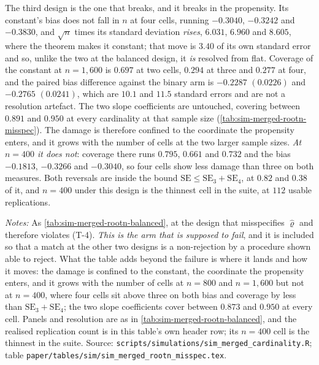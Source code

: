 \documentclass[
  12pt]{article}
\newcommand{\1}[1]{\mathds{1}\left[#1\right]}
\theoremstyle{plain}
\theoremstyle{definition}
\theoremstyle{definition}
\theoremstyle{remark}
\begin{document}
The third design is the one that breaks, and it breaks in the
propensity. Its constant's bias does not fall in \(n\) at four cells,
running \(-0.3040\), \(-0.3242\) and \(-0.3830\), and \(\sqrt n\) times
its standard deviation \emph{rises}, \(6.031\), \(6.960\) and \(8.605\),
where the theorem makes it constant; that move is \(3.40\) of its own
standard error and so, unlike the two at the balanced design, it
\emph{is} resolved from flat. Coverage of the constant at \(n=1{,}600\)
is \(0.697\) at two cells, \(0.294\) at three and \(0.277\) at four, and
the paired bias difference against the binary arm is \(-0.2287\)
\((0.0226)\) and \(-0.2765\) \((0.0241)\), which are \(10.1\) and
\(11.5\) standard errors and are not a resolution artefact. The two
slope coefficients are untouched, covering between \(0.891\) and
\(0.950\) at every cardinality at that sample size
(\cref{tab:sim-merged-rootn-misspec}). The damage is therefore confined
to the coordinate the propensity enters, and it grows with the number of
cells at the two larger sample sizes. \emph{At \(n=400\) it does not}:
coverage there runs \(0.795\), \(0.661\) and \(0.732\) and the bias
\(-0.1813\), \(-0.3266\) and \(-0.3040\), so four cells show less damage
than three on both measures. Both reversals are inside the bound
\(\mathrm{SE}\le\mathrm{SE}_3+\mathrm{SE}_4\), at \(0.82\) and \(0.38\)
of it, and \(n=400\) under this design is the thinnest cell in the
suite, at \(112\) usable replications.

\begin{table}[p]
\centering
\begin{threeparttable}
\caption{The shipped engine at three cardinalities: a misspecified propensity}
\label{tab:sim-merged-rootn-misspec}
\footnotesize

\begin{tablenotes}\footnotesize
\item \textit{Notes:} As \cref{tab:sim-merged-rootn-balanced}, at the design that
misspecifies $\hat\varrho$ and therefore violates (T-4). \emph{This is the arm
that is supposed to fail}, and it is included so that a match at the other two
designs is a non-rejection by a procedure shown able to reject. What the table
adds beyond the failure is where it lands and how it moves: the damage is
confined to the constant, the coordinate the propensity enters, and it grows with
the number of cells at $n=800$ and $n=1{,}600$ but not at $n=400$, where four
cells sit above three on both bias and coverage by less than
$\mathrm{SE}_3+\mathrm{SE}_4$; the two slope coefficients cover between $0.873$
and $0.950$ at every cell. Panels and resolution are as in
\cref{tab:sim-merged-rootn-balanced}, and the realised replication count is in
this table's own header row; its $n=400$ cell is the thinnest in the suite.
Source:
\texttt{scripts/simulations/sim\_merged\_cardinality.R}; table
\texttt{paper/tables/sim/sim\_merged\_rootn\_misspec.tex}.
\end{tablenotes}
\end{threeparttable}
\end{table}
\end{document}
